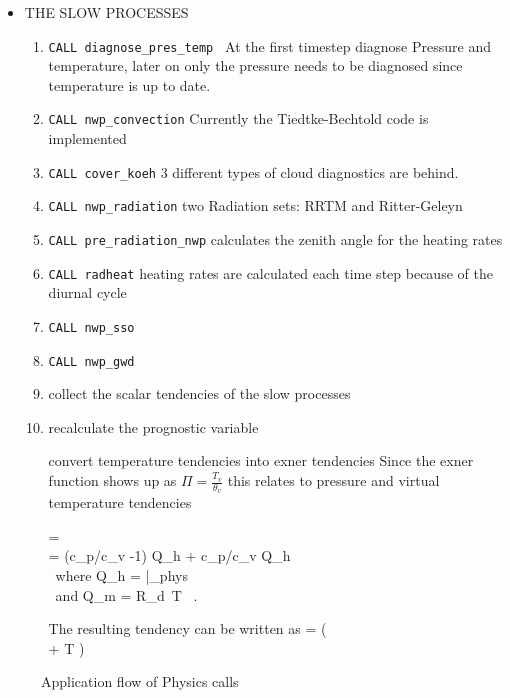 \begin{itemize}
\begin{enumerate}
\end{enumerate}


\item  THE SLOW PROCESSES
\begin{enumerate}
\item \texttt{CALL diagnose\_pres\_temp }
At the first timestep diagnose Pressure and temperature, later on only the pressure needs to be diagnosed since temperature is up to date.
\item \texttt{CALL nwp\_convection} Currently the Tiedtke-Bechtold code is implemented
\item \texttt{CALL cover\_koeh} 3 different types of cloud diagnostics are behind.
\item \texttt{CALL nwp\_radiation} two Radiation sets: RRTM and Ritter-Geleyn
\item \texttt{CALL pre\_radiation\_nwp} calculates the zenith angle for the heating rates
\item \texttt{CALL radheat} heating rates are calculated each time step because of the diurnal cycle
\item \texttt{CALL nwp\_sso}
\item \texttt{CALL nwp\_gwd}

\item collect the scalar tendencies of the slow processes

\item recalculate the prognostic variable

 convert temperature tendencies into exner tendencies
 Since the exner function shows up as $\Pi=\frac{T_v}{\theta_v}$ this relates
 to pressure and virtual temperature tendencies

\bea
  =  \,  \\
  = (c_p/c_v -1) Q_h + c_p/c_v Q_h\\
  \mbox{ where}\;  Q_h =  |_{phys} \\
  \mbox{ and}\; Q_m = R_d \,T \,\rho {} .
\eea

The resulting tendency can be written as
\be
 =  \left(  \\
                        + T  \right) 
\ee

\end{enumerate}


\end{itemize}

\begin{figure}
\begin{center}
\end{center}
\caption{Application flow of Physics calls}
\label{flux}
\end{figure}
